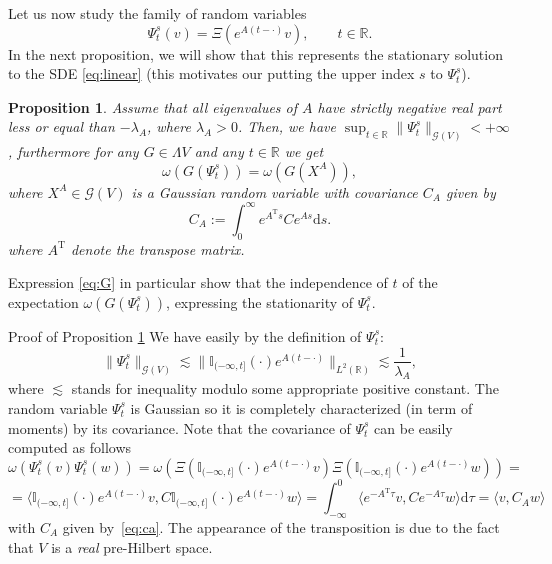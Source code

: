 \documentclass{article}
\newcommand{\Tau}{\mathrm{T}}
\newcommand{\assign}{:=}
\newcommand{\mathd}{\mathrm{d}}
\newcommand{\tmtextit}[1]{{\itshape{#1}}}
\newenvironment{proof*}[1]{\noindent\textbf{#1\ }}{\hspace*{\fill}$\Box$\medskip}
\newtheorem{proposition}[theorem]{Proposition}
{\theorembodyfont{\rmfamily}\newtheorem{remark}[theorem]{Remark}}
\begin{document}
Let us now study the family of random variables
\[ \Psi_t^s (v) = \Xi (e^{A (t - \cdot)} v), \qquad t \in \mathbb{R}. \]
In the next proposition, we will show that this represents the stationary
solution to the SDE {\eqref{eq:linear}} (this motivates our putting the upper
index $s$ to $\Psi^s_t$).

\begin{proposition}
  \label{proposition_linearlimit}Assume that all eigenvalues of $A$ have
  strictly negative real part less or equal than $- \lambda_A$, where
  $\lambda_A > 0$. Then, we have $\sup_{t \in \mathbb{R}} \| \Psi^s_t
  \|_{\mathcal{G} (V)} < + \infty$, furthermore for any $G \in \Lambda V$ and
  any $t \in \mathbb{R}$ we get
  \begin{equation}
    \omega (G (\Psi^s_t)) = \omega (G (X^A)), \label{eq:G}
  \end{equation}
  where $X^A \in \mathcal{G} (V)$ is a Gaussian random variable with
  covariance $C_A$ given by
  \begin{equation}
    C_A \assign \int^{\infty}_0 e^{A^{\Tau} s} C e^{A s} \mathd s.
    \label{eq:ca}
  \end{equation}
  where $A^{\Tau}$ denote the transpose matrix.
\end{proposition}

\begin{remark}
  Expression {\eqref{eq:G}} in particular show that the independence of $t$ of
  the expectation $\omega (G (\Psi^s_t))$, expressing the stationarity of
  $\Psi^s_t$. 
\end{remark}

\begin{proof*}{Proof of Proposition \ref{proposition_linearlimit}}
  We have easily by the definition of $\Psi^s_t$:
  \[ \| \Psi^s_t \|_{\mathcal{G} (V)} \lesssim \| \mathbb{I}_{(- \infty, t]}
     (\cdot) e^{A (t - \cdot)} \|_{L^2 (\mathbb{R})} \lesssim
     \frac{1}{\lambda_A}, \]
  where $\lesssim$ stands for inequality modulo some appropriate positive
  constant. The random variable $\Psi^s_t$ is Gaussian so it is completely
  characterized (in term of moments) by its covariance. Note that the
  covariance of $\Psi_t^s$ can be easily computed as follows
  \[ \omega (\Psi_t^s (v) \Psi_t^s (w)) = \omega (\Xi (\mathbb{I}_{(- \infty,
     t]} (\cdot) e^{A (t - \cdot)} v) \Xi (\mathbb{I}_{(- \infty, t]} (\cdot)
     e^{A (t - \cdot)} w)) = \]
  \[ = \langle \mathbb{I}_{(- \infty, t]} (\cdot) e^{A (t - \cdot)} v,
     C\mathbb{I}_{(- \infty, t]} (\cdot) e^{A (t - \cdot)} w \rangle =
     \int^0_{- \infty} \langle e^{- A^{\Tau} \tau} v, C e^{- A \tau} w \rangle
     \mathd \tau = \langle v, C_A w \rangle \]
  with $C_A$ given by~{\eqref{eq:ca}}. The appearance of the transposition is
  due to the fact that $V$ is a \tmtextit{real} pre-Hilbert space.
\end{proof*}
\end{document}
